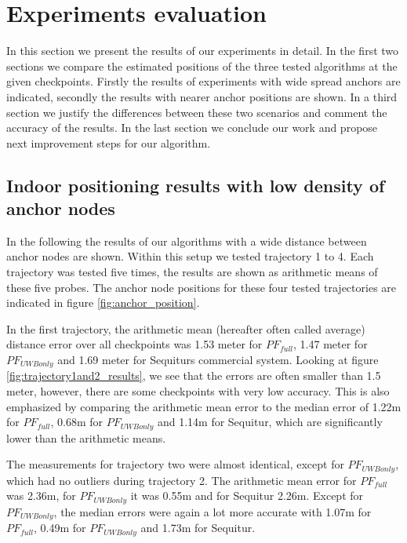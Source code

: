 
\chapter{Experiments evaluation} %

\label{Chapter5} %
In this section we present the results of our experiments in detail. In the first two sections we compare the estimated positions of the three tested algorithms at the given checkpoints. Firstly the results of experiments with wide spread anchors are indicated, secondly the results with nearer anchor positions are shown. In a third section we justify the differences between these two scenarios and comment the accuracy of the results. In the last section we conclude our work and propose next improvement steps for our algorithm. 


\section{Indoor positioning results with low density of anchor nodes}
In the following the results of our algorithms with a wide distance between anchor nodes are shown. Within this setup we tested trajectory 1 to 4. Each trajectory was tested five times, the results are shown as arithmetic means of these five probes. The anchor node positions for these four tested trajectories are indicated in figure \ref{fig:anchor_position}.

In the first trajectory, the arithmetic mean (hereafter often called average) distance error over all checkpoints was 1.53 meter for $PF_{full}$, 1.47 meter for $PF_{UWBonly}$ and 1.69 meter for Sequiturs commercial system. Looking at figure \ref{fig:trajectory1and2_results}, we see that the errors are often smaller than 1.5 meter, however, there are some checkpoints with very low accuracy. This is also emphasized by comparing the arithmetic mean error to the median error of 1.22m for $PF_{full}$, 0.68m for $PF_{UWBonly}$ and 1.14m for Sequitur, which are significantly lower than the arithmetic means.

The measurements for trajectory two were almost identical, except for $PF_{UWBonly}$, which had no outliers during trajectory 2. The arithmetic mean error for $PF_{full}$ was 2.36m, for $PF_{UWBonly}$ it was 0.55m and for Sequitur 2.26m. Except for $PF_{UWBonly}$, the median errors were again a lot more accurate with 1.07m for $PF_{full}$, 0.49m for $PF_{UWBonly}$ and 1.73m for Sequitur.


